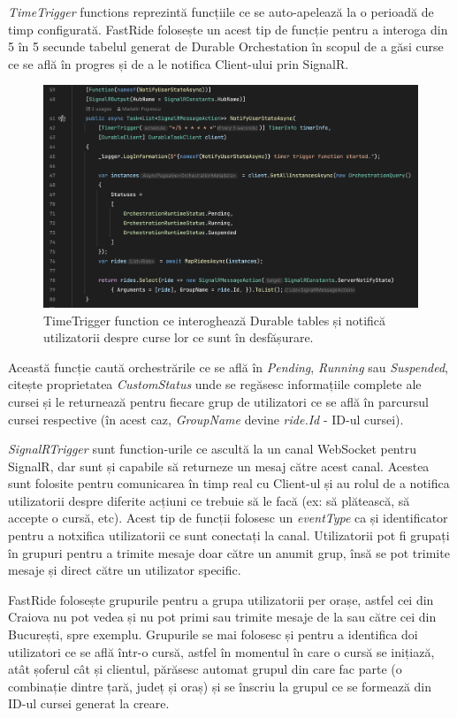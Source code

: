 \textit{TimeTrigger} functions reprezintă funcțiile ce se auto-apelează la o perioadă de timp configurată.
FastRide folosește un acest tip de funcție pentru a interoga din 5 în 5 secunde tabelul generat
de Durable Orchestation în scopul de a găsi curse ce se află în progres și de a le notifica
Client-ului prin SignalR.

\begin{figure}[H]
    \centering
    \includegraphics[width=16cm]{Assets/TimeTrigger.png}
    \caption{TimeTrigger function ce interoghează Durable tables și notifică utilizatorii despre curse lor ce sunt în desfășurare.}
    \label{fig:TimeTrigger}
\end{figure}
Această funcție caută orchestrările ce se află în \textit{Pending}, \textit{Running} sau \textit{Suspended},
citește proprietatea \textit{CustomStatus} unde se regăsesc informațiile complete ale cursei și
le returnează pentru fiecare grup de utilizatori ce se află în parcursul cursei respective (în acest caz, \textit{GroupName} devine \textit{ride.Id} - ID-ul cursei).

\textit{SignalRTrigger} sunt function-urile ce ascultă la un canal WebSocket pentru SignalR, dar sunt și capabile să returneze
un mesaj către acest canal. Acestea sunt folosite pentru comunicarea în timp real cu Client-ul și au rolul de a notifica
utilizatorii despre diferite acțiuni ce trebuie să le facă (ex: să plătească, să accepte o cursă, etc).
Acest tip de funcții folosesc un \textit{eventType} ca și identificator pentru a notxifica utilizatorii ce sunt
conectați la canal. Utilizatorii pot fi grupați în grupuri pentru a trimite mesaje doar către un
anumit grup, însă se pot trimite mesaje și direct către un utilizator specific.

FastRide folosește grupurile pentru a grupa utilizatorii per orașe, astfel cei din Craiova nu pot
vedea și nu pot primi sau trimite mesaje de la sau către cei din București, spre exemplu. Grupurile se mai folosesc și
pentru a identifica doi utilizatori ce se află într-o cursă, astfel în momentul în care o cursă se inițiază,
atât șoferul cât și clientul, părăsesc automat grupul din care fac parte (o combinație dintre țară, județ și oraș)
și se înscriu la grupul ce se formează din ID-ul cursei generat la creare.

